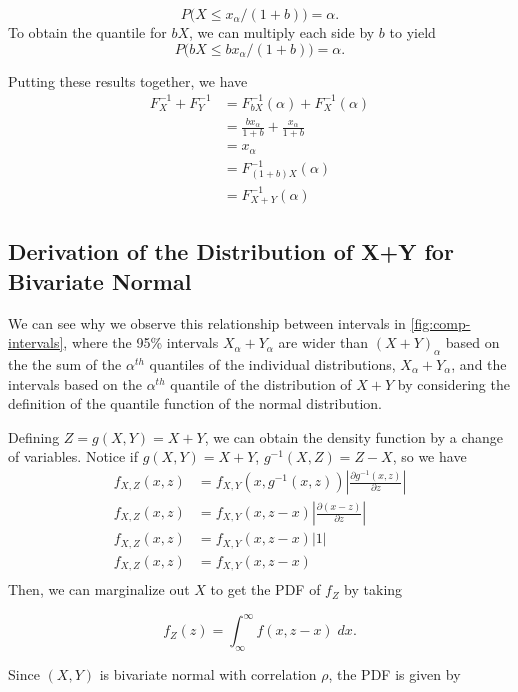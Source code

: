 \documentclass[12pt,twoside]{smiththesis}
\begin{document}
\[P\Big( X \leq x_\alpha/(1+b) \Big) = \alpha.\]
To obtain the quantile for \(bX\), we can multiply each side by \(b\) to yield
\[P\Big( bX \leq bx_\alpha/(1+b) \Big) = \alpha.\]

Putting these results together, we have
\begin{align*}
F^{-1}_X+F^{-1}_Y &= F^{-1}_{bX} (\alpha) + F^{-1}_{X} (\alpha) \\
&= \frac{bx_\alpha } { 1+b} + \frac{x_\alpha}{1+b}\\
&= x_\alpha \\
&= F^{-1}_{(1+b)X}(\alpha)\\
&=F^{-1}_{X+Y}(\alpha) \end{align*}

\hypertarget{derivation-of-the-distribution-of-xy-for-bivariate-normal}{%
\subsection{Derivation of the Distribution of X+Y for Bivariate Normal}\label{derivation-of-the-distribution-of-xy-for-bivariate-normal}}

We can see why we observe this relationship between intervals in \ref{fig:comp-intervals}, where the 95\% intervals \(X_\alpha +Y_\alpha\) are wider than \((X+Y)_\alpha\) based on the the sum of the \(\alpha^{th}\) quantiles of the individual distributions, \(X_\alpha + Y_\alpha\), and the intervals based on the \(\alpha^{th}\) quantile of the distribution of \(X+Y\) by considering the definition of the quantile function of the normal distribution.

Defining \(Z=g(X,Y) = X+Y\), we can obtain the density function by a change of variables. Notice if \(g(X,Y) = X+Y\), \(g^{-1}(X,Z) = Z-X\), so we have
\begin{align*} f_{X,Z}(x,z) &= f_{X,Y}(x,g^{-1}(x,z)) \left|\frac{\partial g^{-1}(x,z)}{\partial z}\right| \\
f_{X,Z}(x,z) &= f_{X,Y}(x,z-x) \left|\frac{\partial (x-z)}{\partial z}\right|\\
f_{X,Z}(x,z) &= f_{X,Y}(x,z-x) \left|1\right|\\
f_{X,Z}(x,z) &= f_{X,Y}(x,z-x) \\
\end{align*}
Then, we can marginalize out \(X\) to get the PDF of \(f_Z\) by taking

\[f_Z(z) = \int_{\infty}^\infty f(x,z-x) \; dx.\]

Since \((X,Y)\) is bivariate normal with correlation \(\rho\), the PDF is given by
\end{document}
